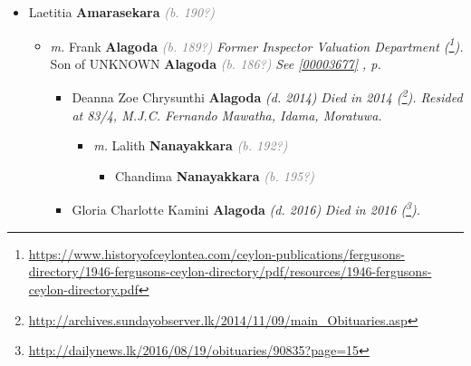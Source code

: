 \documentclass[10pt, openany]{book}
\begin{document}
\begin{itemize}
{\begin{itemize}
{\begin{itemize}
{\begin{itemize}
{\begin{itemize}
{\begin{itemize}
{\begin{itemize}
{\begin{itemize}
\item{Athulya \textbf{Dissanayake} \textcolor{gray}{\textit{(b. 198?)}}
 }
\item{Anishka \textbf{Dissanayake} \textcolor{gray}{\textit{(b. 198?)}}
 }
\end{itemize}}
\end{itemize}
 }
\end{itemize}}
\end{itemize}
 }
\item{Zeta \textbf{Dissanayake} \textcolor{gray}{\textit{(b. 193?)}}
 }
\end{itemize}}
\end{itemize}
  }
\item{Laetitia  \textbf{Amarasekara} \textcolor{gray}{\textit{(b. 190?)}}
\begin{itemize}
\item{\textit{m.} Frank \textbf{Alagoda} \textcolor{gray}{\textit{(b. 189?)}} \textcolor{slmaroon}{\textit{Former Inspector Valuation Department (\footnote{\url{https://www.historyofceylontea.com/ceylon-publications/fergusons-directory/1946-fergusons-ceylon-directory/pdf/resources/1946-fergusons-ceylon-directory.pdf}}).}} Son of  UNKNOWN \textbf{Alagoda} \textcolor{gray}{\textit{(b. 186?)}} \textcolor{slteal}{\textit{See  \autoref{00003677} \textit{, p. \pageref{00003677} }}}   \label{couple:00003626:00003631} \begin{itemize}
\item{Deanna Zoe Chrysunthi \textbf{Alagoda} \textcolor{slorange}{\textit{(d. 2014)}} \textcolor{slmaroon}{\textit{Died in 2014 (\footnote{\url{http://archives.sundayobserver.lk/2014/11/09/main_Obituaries.asp}}).
Resided at 83/4, M.J.C. Fernando Mawatha, Idama, Moratuwa.}}
\begin{itemize}
\item{\textit{m.} Lalith \textbf{Nanayakkara} \textcolor{gray}{\textit{(b. 192?)}}   \label{couple:00003627:00003632} \begin{itemize}
\item{Chandima \textbf{Nanayakkara} \textcolor{gray}{\textit{(b. 195?)}}
 }
\end{itemize}}
\end{itemize}
   }
\item{Gloria Charlotte Kamini \textbf{Alagoda} \textcolor{slorange}{\textit{(d. 2016)}} \textcolor{slmaroon}{\textit{Died in 2016 (\footnote{\url{http://dailynews.lk/2016/08/19/obituaries/90835?page=15}}).
}}}
\end{itemize}}
\end{itemize}}
\end{itemize}}
\end{itemize}
\end{document}
